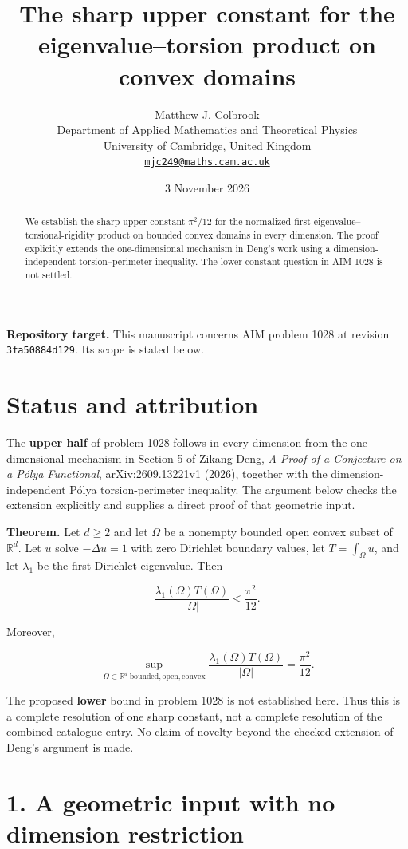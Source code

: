 \documentclass[11pt,a4paper]{article}
\title{\textbf{The sharp upper constant for the eigenvalue--torsion product on convex domains}}
\author{Matthew J. Colbrook\\[3pt]
{\small Department of Applied Mathematics and Theoretical Physics}\\
{\small University of Cambridge, United Kingdom}\\
{\small\href{mailto:mjc249@maths.cam.ac.uk}{\texttt{mjc249@maths.cam.ac.uk}}}}
\date{3 November 2026}
\begin{document}
\maketitle
\begin{abstract}
We establish the sharp upper constant $\pi^2/12$ for the normalized first-eigenvalue--torsional-rigidity product on bounded convex domains in every dimension. The proof explicitly extends the one-dimensional mechanism in Deng's work using a dimension-independent torsion--perimeter inequality. The lower-constant question in AIM 1028 is not settled.
\end{abstract}
\noindent\textbf{Repository target.}
This manuscript concerns AIM problem 1028 at revision
\texttt{3fa50884d129}. Its scope is stated below.
\medskip

\hypertarget{1028-status-and-attribution}{%
\section{Status and attribution}\label{1028-status-and-attribution}}

The \textbf{upper half} of problem 1028 follows in every dimension from
the one-dimensional mechanism in Section 5 of Zikang Deng, \emph{A Proof
of a Conjecture on a Pólya Functional}, arXiv:2609.13221v1 (2026),
together with the dimension-independent Pólya torsion-perimeter
inequality. The argument below checks the extension explicitly and
supplies a direct proof of that geometric input.

\textbf{Theorem.} Let \(d \ge 2\) and let \(\Omega\) be a nonempty
bounded open convex subset of \(\mathbb R^d\). Let \(u\) solve
\(-\Delta u=1\) with zero Dirichlet boundary values, let
\(T=\int _\Omega u\), and let \(\lambda _1\) be the first Dirichlet
eigenvalue. Then

\[
 \frac{\lambda_1(\Omega)T(\Omega)}{|\Omega|}<\frac{\pi^2}{12}.
\]

Moreover,

\[
 \sup_{\Omega\subset\mathbb R^d\ \mathrm{bounded,open,convex}}
 \frac{\lambda_1(\Omega)T(\Omega)}{|\Omega|}=\frac{\pi^2}{12}.
\]

The proposed \textbf{lower} bound in problem 1028 is not established
here. Thus this is a complete resolution of one sharp constant, not a
complete resolution of the combined catalogue entry. No claim of novelty
beyond the checked extension of Deng's argument is made.

\hypertarget{1028-a-geometric-input-with-no-dimension-restriction}{%
\section{1. A geometric input with no dimension
restriction}\label{1028-a-geometric-input-with-no-dimension-restriction}}
\end{document}
